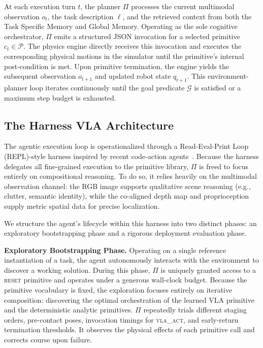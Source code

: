 \documentclass{article}
\begin{document}
	At each execution turn $t$, the planner $\Pi$ processes the current multimodal observation $o_t$, the task description $\ell$, and the retrieved context from both the Task Specific Memory and Global Memory. Operating as the sole cognitive orchestrator, $\Pi$ emits a structured JSON invocation for a selected primitive $c_t \in \mathcal{P}$. The physics engine directly receives this invocation and executes the corresponding physical motions in the simulator until the primitive's internal post-condition is met. Upon primitive termination, the engine yields the subsequent observation $o_{t+1}$ and updated robot state $q_{t+1}$. This environment-planner loop iterates continuously until the goal predicate $\mathcal{G}$ is satisfied or a maximum step budget is exhausted.

	\subsection{The Harness VLA Architecture}
	\label{sec:method:harness}

The agentic execution loop is operationalized through a Read-Eval-Print Loop (REPL)-style harness inspired by recent code-action agents~\citep{wang2024codeact, yang2024sweagent, wang2025openhands}. Because the harness delegates all fine-grained execution to the primitive library, $\Pi$ is freed to focus entirely on compositional reasoning. To do so, it relies heavily on the multimodal observation channel: the RGB image supports qualitative scene reasoning (e.g., clutter, semantic identity), while the co-aligned depth map and proprioception supply metric spatial data for precise localization.

We structure the agent's lifecycle within this harness into two distinct phases: an exploratory bootstrapping phase and a rigorous deployment evaluation phase.

\textbf{Exploratory Bootstrapping Phase.} Operating on a single reference instantiation of a task, the agent autonomously interacts with the environment to discover a working solution. During this phase, $\Pi$ is uniquely granted access to a \textsc{reset} primitive and operates under a generous wall-clock budget. Because the primitive vocabulary is fixed, the exploration focuses entirely on iterative composition: discovering the optimal orchestration of the learned VLA primitive and the deterministic analytic primitives. $\Pi$ repeatedly trials different staging orders, pre-contact poses, invocation timings for \textsc{vla\_act}, and early-return termination thresholds. It observes the physical effects of each primitive call and corrects course upon failure.
\end{document}
